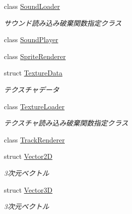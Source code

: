 \begin{DoxyCompactItemize}
class \mbox{\hyperlink{class_effekseer_1_1_sound_loader}{Sound\+Loader}}
\begin{DoxyCompactList}\small\item\em サウンド読み込み破棄関数指定クラス \end{DoxyCompactList}\item 
class \mbox{\hyperlink{class_effekseer_1_1_sound_player}{Sound\+Player}}
\item 
class \mbox{\hyperlink{class_effekseer_1_1_sprite_renderer}{Sprite\+Renderer}}
\item 
struct \mbox{\hyperlink{struct_effekseer_1_1_texture_data}{Texture\+Data}}
\begin{DoxyCompactList}\small\item\em テクスチャデータ \end{DoxyCompactList}\item 
class \mbox{\hyperlink{class_effekseer_1_1_texture_loader}{Texture\+Loader}}
\begin{DoxyCompactList}\small\item\em テクスチャ読み込み破棄関数指定クラス \end{DoxyCompactList}\item 
class \mbox{\hyperlink{class_effekseer_1_1_track_renderer}{Track\+Renderer}}
\item 
struct \mbox{\hyperlink{struct_effekseer_1_1_vector2_d}{Vector2D}}
\begin{DoxyCompactList}\small\item\em 3次元ベクトル \end{DoxyCompactList}\item 
struct \mbox{\hyperlink{struct_effekseer_1_1_vector3_d}{Vector3D}}
\begin{DoxyCompactList}\small\item\em 3次元ベクトル \end{DoxyCompactList}\end{DoxyCompactItemize}
